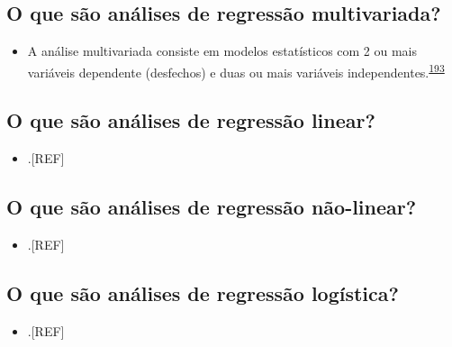 \documentclass[
  a4paper,
]{book}
\providecommand{\tightlist}{%
  \setlength{\itemsep}{0pt}\setlength{\parskip}{0pt}}
\begin{document}
\hypertarget{o-que-suxe3o-anuxe1lises-de-regressuxe3o-multivariada}{%
\subsection{O que são análises de regressão multivariada?}\label{o-que-suxe3o-anuxe1lises-de-regressuxe3o-multivariada}}

\begin{itemize}
\tightlist
\item
  A análise multivariada consiste em modelos estatísticos com 2 ou mais variáveis dependente (desfechos) e duas ou mais variáveis independentes.\textsuperscript{\protect\hyperlink{ref-Hidalgo2013}{193}}
\end{itemize}

\hypertarget{o-que-suxe3o-anuxe1lises-de-regressuxe3o-linear}{%
\subsection{O que são análises de regressão linear?}\label{o-que-suxe3o-anuxe1lises-de-regressuxe3o-linear}}

\begin{itemize}
\tightlist
\item
  .{[}REF{]}
\end{itemize}

\hypertarget{o-que-suxe3o-anuxe1lises-de-regressuxe3o-nuxe3o-linear}{%
\subsection{O que são análises de regressão não-linear?}\label{o-que-suxe3o-anuxe1lises-de-regressuxe3o-nuxe3o-linear}}

\begin{itemize}
\tightlist
\item
  .{[}REF{]}
\end{itemize}

\hypertarget{o-que-suxe3o-anuxe1lises-de-regressuxe3o-loguxedstica}{%
\subsection{O que são análises de regressão logística?}\label{o-que-suxe3o-anuxe1lises-de-regressuxe3o-loguxedstica}}

\begin{itemize}
\tightlist
\item
  .{[}REF{]}
\end{itemize}
\end{document}
